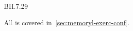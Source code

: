 
\setcounter{theorem}{28}
\begin{exercise}BH.7.29
\begin{solution}
All is covered in~\cref{sec:memoryl-exerc-conf}.
\end{solution}
\end{exercise}

